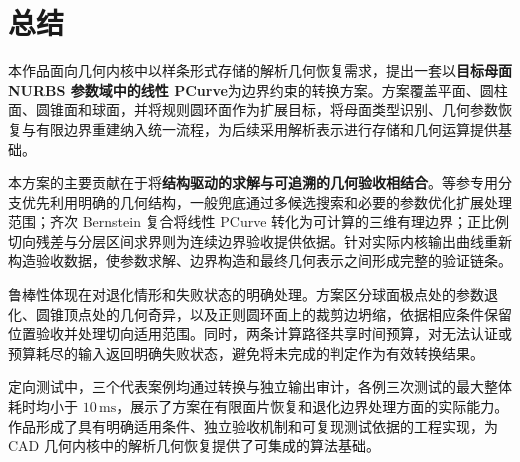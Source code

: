 \section{总结}
本作品面向几何内核中以样条形式存储的解析几何恢复需求，提出一套以\textbf{目标母面 NURBS 参数域中的线性 PCurve}为边界约束的转换方案。方案覆盖平面、圆柱面、圆锥面和球面，并将规则圆环面作为扩展目标，将母面类型识别、几何参数恢复与有限边界重建纳入统一流程，为后续采用解析表示进行存储和几何运算提供基础。

本方案的主要贡献在于将\textbf{结构驱动的求解与可追溯的几何验收相结合}。等参专用分支优先利用明确的几何结构，一般兜底通过多候选搜索和必要的参数优化扩展处理范围；齐次 Bernstein 复合将线性 PCurve 转化为可计算的三维有理边界；正比例切向残差与分层区间求界则为连续边界验收提供依据。针对实际内核输出曲线重新构造验收数据，使参数求解、边界构造和最终几何表示之间形成完整的验证链条。

鲁棒性体现在对退化情形和失败状态的明确处理。方案区分球面极点处的参数退化、圆锥顶点处的几何奇异，以及正则圆环面上的裁剪边坍缩，依据相应条件保留位置验收并处理切向适用范围。同时，两条计算路径共享时间预算，对无法认证或预算耗尽的输入返回明确失败状态，避免将未完成的判定作为有效转换结果。

定向测试中，三个代表案例均通过转换与独立输出审计，各例三次测试的最大整体耗时均小于 $10\,\mathrm{ms}$，展示了方案在有限面片恢复和退化边界处理方面的实际能力。作品形成了具有明确适用条件、独立验收机制和可复现测试依据的工程实现，为 CAD 几何内核中的解析几何恢复提供了可集成的算法基础。
